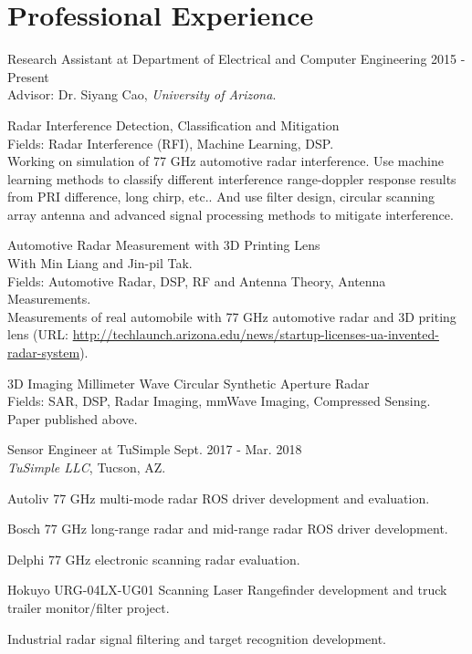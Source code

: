 \documentclass[letterpaper,10pt]{article}
\renewenvironment{itemize}{
  \begin{list}{}{
    \setlength{\leftmargin}{1.5em}
  }
}{
  \end{list}
}
\begin{document}
\section*{Professional Experience}
\begin{itemize}
\item [--] Research Assistant at Department of Electrical and Computer Engineering \hfill 2015 - Present\\
Advisor: Dr. Siyang Cao, {\it University of Arizona}.
\begin{itemize}
\item [--] Radar Interference Detection, Classification and Mitigation\\
Fields: Radar Interference (RFI), Machine Learning, DSP.\\
Working on simulation of 77 GHz automotive radar interference. Use machine learning methods to classify different interference range-doppler response results from PRI difference, long chirp, etc.. And use filter design, circular scanning array antenna and advanced signal processing methods to mitigate interference.
\item [--] Automotive Radar Measurement with 3D Printing Lens\\
With Min Liang and Jin-pil Tak.\\
Fields: Automotive Radar, DSP, RF and Antenna Theory, Antenna Measurements.\\
Measurements of real automobile with 77 GHz automotive radar and 3D priting lens (URL: \url{http://techlaunch.arizona.edu/news/startup-licenses-ua-invented-radar-system}).
\item [--] 3D Imaging Millimeter Wave Circular Synthetic Aperture Radar\\
Fields: SAR, DSP, Radar Imaging, mmWave Imaging, Compressed Sensing.\\
Paper published above.
\end{itemize}

\item [--] Sensor Engineer at TuSimple \hfill Sept. 2017 - Mar. 2018\\
{\it TuSimple LLC}, Tucson, AZ.
\begin{itemize}
\item [--] Autoliv\textsuperscript{\textregistered} 77 GHz multi-mode radar ROS driver development and evaluation.
\item [--] Bosch\textsuperscript{\textregistered} 77 GHz long-range radar and mid-range radar ROS driver development.
\item [--] Delphi\textsuperscript{\textregistered} 77 GHz electronic scanning radar evaluation.
\item [--] Hokuyo\textsuperscript{\textregistered} URG-04LX-UG01 Scanning Laser Rangefinder development and truck trailer monitor/filter project.
\item [--] Industrial radar signal filtering and target recognition development.


\end{itemize}
\end{itemize}
\end{document}
